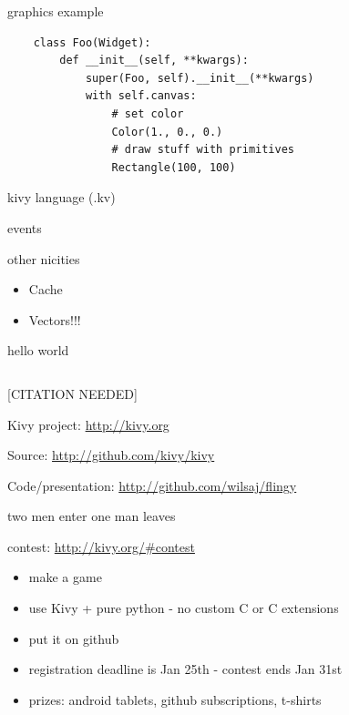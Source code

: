 \documentclass{beamer}
\begin{document}
\begin{frame}[fragile]{graphics example}
  \begin{verbatim}
    class Foo(Widget):
        def __init__(self, **kwargs):
            super(Foo, self).__init__(**kwargs)
            with self.canvas:
                # set color
                Color(1., 0., 0.)
                # draw stuff with primitives
                Rectangle(100, 100)
  \end{verbatim}
\end{frame}


\begin{frame}{kivy language (.kv)}

\end{frame}


\begin{frame}{events}

\end{frame}


\begin{frame}{other nicities}
\begin{itemize}
  \item Cache
  \pause
  \item Vectors!!!
\end{itemize}
\end{frame}


\begin{frame}[fragile]{hello world}
  \inputminted{python}{hello_world.py}
\end{frame}



\begin{frame}{[CITATION NEEDED]}

Kivy project:  \url{http://kivy.org}

Source: \url{http://github.com/kivy/kivy}

Code/presentation: \url{http://github.com/wilsaj/flingy}

\end{frame}


\begin{frame}{two men enter one man leaves}

contest: \url{http://kivy.org/\#contest}

\begin{itemize}
  \item make a game
  \item use Kivy + pure python - no custom C or C extensions
  \item put it on github
  \item registration deadline is Jan 25th - contest ends Jan 31st
  \item prizes: android tablets, github subscriptions, t-shirts
\end{itemize}
\end{frame}
\end{document}
